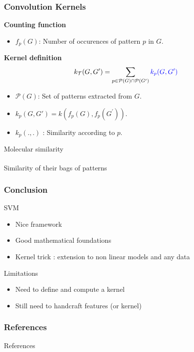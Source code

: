\documentclass[11pt, pdf, compress, handout]{beamer}
\begin{document}
\begin{frame}
  \frametitle{Convolution Kernels}
  
  \textbf{Counting function}
  \begin{itemize}
  \item $f_p(G)$: Number of occurences of pattern $p$ in $G$.
  \end{itemize}
  \textbf{Kernel definition}
  \begin{equation*}
    k_{\mathcal{T}}(G,G^\prime) = \sum_{p \in \mathcal{P}(G) \cap \mathcal{P}(G^\prime)} \textcolor{blue}{k_p(G,G')}
  \end{equation*}
  \begin{itemize}
  \item $\mathcal{P}(G)$: Set of patterns extracted from $G$.
  \item $k_p(G,G') = k(f_p(G),f_p(G^\prime))$.
  \item $k_p(.,.)$ : Similarity according to $p$.
  \end{itemize}
  \begin{center}
    {\large Molecular similarity \\ \doublearrow~ \\ Similarity of
      their bags of patterns}
  \end{center}
\end{frame}


\begin{frame}
  \frametitle{Conclusion}
  \begin{block}{SVM}
    \begin{itemize}
    \item Nice framework
    \item Good mathematical foundations
    \item Kernel trick : extension to non linear models and any data
    \end{itemize}
  \end{block}
  \begin{block}{Limitations}
    \begin{itemize}
    \item Need to define and compute a kernel
    \item Still need to handcraft features (or kernel)
    \end{itemize}
  \end{block}
\end{frame}

\nocite{*}

\begin{frame}
  \frametitle{References}
    \begin{block}{References}
      
      
  \end{block}
\end{frame}
\end{document}
